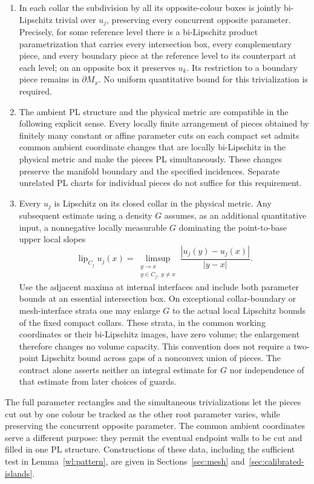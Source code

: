 \begin{definition}
\begin{enumerate}
\item In each collar the subdivision by all its opposite-colour boxes
is jointly bi-Lipschitz trivial over $u_j$, preserving every concurrent
opposite parameter.  Precisely, for some reference level there is a
bi-Lipschitz product parametrization that carries every intersection
box, every complementary piece, and every boundary piece at the
reference level to its counterpart at each level; on an opposite box
it preserves $u_k$.  Its restriction to a boundary piece remains in
$\partial M_x$.  No uniform quantitative bound for this
trivialization is required.

\item The ambient PL structure and the physical metric are compatible
in the following explicit sense.  Every locally finite arrangement
of pieces obtained by finitely many constant or affine parameter cuts
on each compact set admits common ambient coordinate changes that are
locally bi-Lipschitz in the physical metric and make the pieces PL
simultaneously.  These changes preserve the manifold boundary and
the specified incidences.  Separate unrelated PL charts for individual
pieces do not suffice for this requirement.

\item Every $u_j$ is Lipschitz on its closed collar in the physical
metric.  Any subsequent estimate using a density $G$ assumes, as an
additional quantitative input, a nonnegative locally measurable $G$
dominating the point-to-base upper local slopes
\[
 \operatorname{lip}_{C_j}u_j(x)
   =\limsup_{\substack{y\to x\\y\in C_j,\ y\ne x}}
         \frac{|u_j(y)-u_j(x)|}{|y-x|}.
\]
Use the adjacent maxima at internal interfaces and include both
parameter bounds at an essential intersection box.  On exceptional
collar-boundary or mesh-interface strata one may enlarge $G$ to the
actual local Lipschitz bounds of the fixed compact collars.  These
strata, in the common working coordinates or their bi-Lipschitz
images, have zero volume; the enlargement therefore changes no
volume capacity.  This convention does not require a two-point
Lipschitz bound across gaps of a nonconvex union of pieces.  The
contract alone asserts neither an integral estimate for $G$ nor
independence of that estimate from later choices of guards.
\end{enumerate}
\end{definition}

The full parameter rectangles and the simultaneous trivializations
let the pieces cut out by one colour be tracked as the other root
parameter varies, while preserving the concurrent opposite parameter.
The common ambient coordinates
serve a different purpose: they permit the eventual endpoint walls to
be cut and filled in one PL structure.  Constructions of these data,
including the sufficient test in Lemma~\ref{wl:pattern}, are given in
Sections~\ref{sec:mesh} and~\ref{sec:calibrated-islands}.

